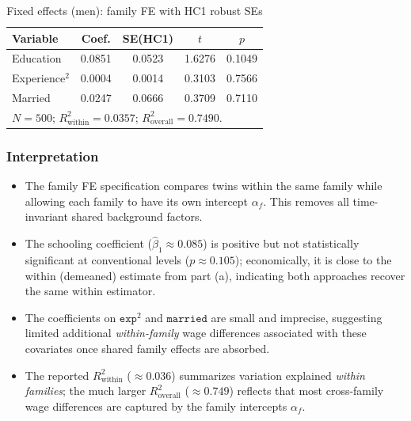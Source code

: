 \documentclass[12pt]{article}
\begin{document}
\begin{table}[htbp]
  \centering
  \caption{Fixed effects (men): family FE with HC1 robust SEs}
  \label{tab:q4b_fe_men}
  \small
  \begin{tabular}{l
                  S[table-format=1.4]
                  S[table-format=1.4]
                  S[table-format=2.4]
                  S[table-format=1.4]}
    \toprule
    Variable & {Coef.} & {SE(HC1)} & {$t$} & {$p$} \\
    \midrule
    Education         & 0.0851 & 0.0523 & 1.6276 & 0.1049 \\
    Experience$^{2}$  & 0.0004 & 0.0014 & 0.3103 & 0.7566 \\
    Married           & 0.0247 & 0.0666 & 0.3709 & 0.7110 \\
    \midrule
     \\
    \bottomrule
  \end{tabular}
\end{table}

\subsubsection*{Interpretation}
\begin{itemize}[leftmargin=1.25em]
  \item The family FE specification compares twins within the same family while allowing each family to have its own intercept $\alpha_f$. This removes all time-invariant shared background factors.
  \item The schooling coefficient (\(\widehat\beta_1\approx0.085\)) is positive but not statistically significant at conventional levels (\(p\approx0.105\)); economically, it is close to the within (demeaned) estimate from part (a), indicating both approaches recover the same within estimator.
  \item The coefficients on \(\texttt{exp}^2\) and \(\texttt{married}\) are small and imprecise, suggesting limited additional \emph{within-family} wage differences associated with these covariates once shared family effects are absorbed.
  \item The reported \(R^2_{\text{within}}\) (\(\approx0.036\)) summarizes variation explained \emph{within families}; the much larger \(R^2_{\text{overall}}\) (\(\approx0.749\)) reflects that most cross-family wage differences are captured by the family intercepts \(\alpha_f\).
\end{itemize}
\end{document}
